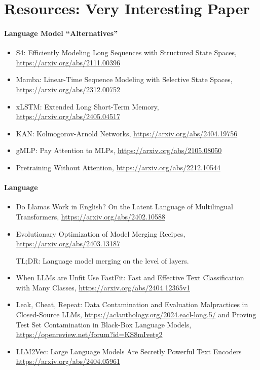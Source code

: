 \section{Resources: Very Interesting Paper}

\paragraph{Language Model ``Alternatives''}

\begin{itemize}
\item S4: Efficiently Modeling Long Sequences with Structured State Spaces, \url{https://arxiv.org/abs/2111.00396}

\item Mamba: Linear-Time Sequence Modeling with Selective State Spaces, \url{https://arxiv.org/abs/2312.00752}

\item xLSTM: Extended Long Short-Term Memory, \url{https://arxiv.org/abs/2405.04517}

\item KAN: Kolmogorov-Arnold Networks, \url{https://arxiv.org/abs/2404.19756}

\item gMLP: Pay Attention to MLPs, \url{https://arxiv.org/abs/2105.08050}

\item Pretraining Without Attention, \url{https://arxiv.org/abs/2212.10544}
\end{itemize}

\paragraph{Language}

\begin{itemize}
\item Do Llamas Work in English? On the Latent Language of Multilingual Transformers, \url{https://arxiv.org/abs/2402.10588}

\item Evolutionary Optimization of Model Merging Recipes, 
\url{https://arxiv.org/abs/2403.13187}

TL;DR: Language model merging on the level of layers.

\item When LLMs are Unfit Use FastFit: Fast and Effective Text Classification with Many Classes,
\url{https://arxiv.org/abs/2404.12365v1}

\item Leak, Cheat, Repeat: Data Contamination and Evaluation Malpractices in Closed-Source LLMs,
\url{https://aclanthology.org/2024.eacl-long.5/}
\newline
and
\newline
Proving Test Set Contamination in Black-Box Language Models, \url{https://openreview.net/forum?id=KS8mIvetg2}

\item LLM2Vec: Large Language Models Are Secretly Powerful Text Encoders
\url{https://arxiv.org/abs/2404.05961}

\end{itemize}

